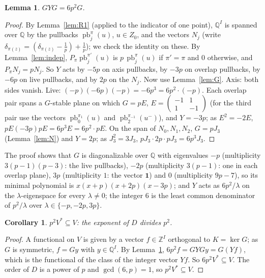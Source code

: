 \documentclass[11pt]{article}
\newtheorem{lemma}[theorem]{Lemma}
\newtheorem{corollary}[theorem]{Corollary}
\theoremstyle{definition}
\theoremstyle{remark}
\newcommand{\Z}{\mathbb{Z}}
\newcommand{\Q}{\mathbb{Q}}
\newcommand{\pb}{\operatorname{pb}}
\newcommand{\one}{\mathbf{1}}
\begin{document}
\begin{lemma}\label{lem:GYG}
$GYG=6p^2G$.
\end{lemma}

\begin{proof}
By Lemma~\ref{lem:R1} (applied to the indicator of one point), $\Q^I$ is spanned over $\Q$ by the pullbacks $\pb_j^\pi(u)$, $u\in Z_0$, and the vectors $N_j$ (write $\delta_{\pi(z)}=(\delta_{\pi(z)}-\tfrac1p)+\tfrac1p$); we check the identity on these. By Lemma~\ref{lem:indep}, $P_\pi\pb_j^{\pi'}(u)$ is $p\,\pb_j^\pi(u)$ if $\pi'=\pi$ and $0$ otherwise, and $P_\pi N_j=pN_j$. So $Y$ acts by $-5p$ on axis pullbacks, by $-3p$ on overlap pullbacks, by $-6p$ on live pullbacks, and by $2p$ on the $N_j$. Now use Lemma~\ref{lem:G}. Axis: both sides vanish. Live: $(-p)(-6p)(-p)=-6p^3=6p^2\cdot(-p)$. Each overlap pair spans a $G$-stable plane on which $G=pE$, $E=\begin{pmatrix}-1&1\\1&-1\end{pmatrix}$ (for the third pair use the vectors $\pb_0^{\pi_1}(u)$ and $\pb_2^{\pi_{-1}}(u^-)$), and $Y=-3p$; as $E^2=-2E$, $pE(-3p)pE=6p^3E=6p^2\cdot pE$. On the span of $N_0,N_1,N_2$, $G=pJ_3$ (Lemma~\ref{lem:N}) and $Y=2p$; as $J_3^2=3J_3$, $pJ_3\cdot 2p\cdot pJ_3=6p^3J_3$.
\end{proof}

The proof shows that $G$ is diagonalizable over $\Q$ with eigenvalues $-p$ (multiplicity $3(p-1)(p-3)$: the live pullbacks), $-2p$ (multiplicity $3(p-1)$: one in each overlap plane), $3p$ (multiplicity $1$: the vector $\one$) and $0$ (multiplicity $9p-7$), so its minimal polynomial is $x(x+p)(x+2p)(x-3p)$; and $Y$ acts as $6p^2/\lambda$ on the $\lambda$-eigenspace for every $\lambda\neq0$; the integer $6$ is the least common denominator of $p^2/\lambda$ over $\lambda\in\{-p,-2p,3p\}$.

\begin{corollary}\label{cor:exp}
$p^2V^\ast\subseteq V$: the exponent of $D$ divides $p^2$.
\end{corollary}

\begin{proof}
A functional on $V$ is given by a vector $f\in\Z^I$ orthogonal to $K=\ker G$; as $G$ is symmetric, $f=Gy$ with $y\in\Q^I$. By Lemma~\ref{lem:GYG}, $6p^2f=GYGy=G(Yf)$, which is the functional of the class of the integer vector $Yf$. So $6p^2V^\ast\subseteq V$. The order of $D$ is a power of $p$ and $\gcd(6,p)=1$, so $p^2V^\ast\subseteq V$.
\end{proof}
\end{document}
